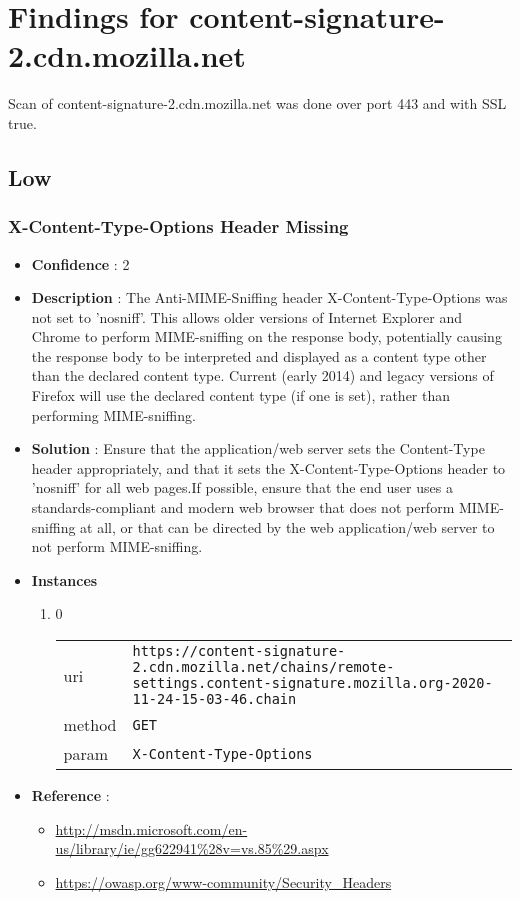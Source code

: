 \documentclass[10pt]{article}
\begin{document}
\section{Findings for content-signature-2.cdn.mozilla.net}
Scan of content-signature-2.cdn.mozilla.net was done over port 443 and with SSL true.
\subsection{Low}
\subsubsection{X-Content-Type-Options Header Missing}
\begin{itemize}
\item[] \textbf{Confidence} : 2
\item[] \textbf{Description} : The Anti-MIME-Sniffing header X-Content-Type-Options was not set to 'nosniff'. This allows older versions of Internet Explorer and Chrome to perform MIME-sniffing on the response body, potentially causing the response body to be interpreted and displayed as a content type other than the declared content type. Current (early 2014) and legacy versions of Firefox will use the declared content type (if one is set), rather than performing MIME-sniffing.
\item[] \textbf{Solution} :  Ensure that the application/web server sets the Content-Type header appropriately, and that it sets the X-Content-Type-Options header to 'nosniff' for all web pages.If possible, ensure that the end user uses a standards-compliant and modern web browser that does not perform MIME-sniffing at all, or that can be directed by the web application/web server to not perform MIME-sniffing.
\item[] \textbf{Instances}
\begin{enumerate}
\item[] 0
\begin{tabular}{| l | p{12cm}}
uri & \texttt{https://content-signature-2.cdn.mozilla.net/chains/remote-settings.content-signature.mozilla.org-2020-11-24-15-03-46.chain} \\
method & \texttt{GET} \\
param & \texttt{X-Content-Type-Options} \\
\end{tabular}
\end{enumerate}
\item[] \textbf{Reference} : 
\begin{itemize}
\item \url{http://msdn.microsoft.com/en-us/library/ie/gg622941\%28v=vs.85\%29.aspx}
\item \url{https://owasp.org/www-community/Security\_Headers}
\end{itemize}
\end{itemize}
\end{document}
